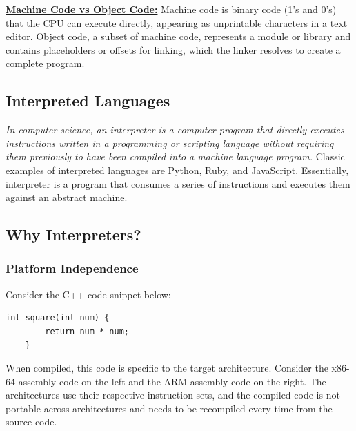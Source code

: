 \documentclass[11pt,paper=a4,answers]{exam}
\begin{document}
\begin{tcolorbox}
    \href{https://stackoverflow.com/questions/466790/assembly-code-vs-machine-code-vs-object-code}{\textbf{Machine Code vs Object Code:}}
    Machine code is binary code (1's and 0's) that the CPU can execute directly, appearing as unprintable characters in a text editor. Object code, a subset of machine code, represents a module or library and contains placeholders or offsets for linking, which the linker resolves to create a complete program.
 \end{tcolorbox}

\subsection{Interpreted Languages}
\textit{In computer science, an interpreter is a computer program that directly executes instructions written in a programming or scripting language without requiring them previously to have been compiled into a machine language program.} Classic examples of interpreted languages are Python, Ruby, and JavaScript. Essentially, interpreter is a program that consumes a series of instructions and executes them against an abstract machine.

\subsection{Why Interpreters?}
\subsubsection{Platform Independence}
Consider the C++ code snippet below:
\begin{lstlisting}[style=cppStyle]
    int square(int num) {
        return num * num;
    }
\end{lstlisting}
When compiled, this code is specific to the target architecture. Consider the x86-64 assembly code on the left and the ARM assembly code on the right. The architectures use their respective instruction sets, and the compiled code is not portable across architectures and needs to be recompiled every time from the source code.
\end{document}
